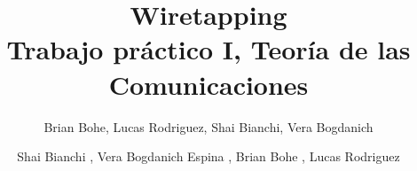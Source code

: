 \documentclass[journal]{IEEEtran}
\begin{document}
\title{Wiretapping \\ {\large Trabajo pr\'actico I, Teor\'ia de las Comunicaciones}}

\author{Brian Bohe, Lucas Rodriguez, Shai Bianchi, Vera Bogdanich}

\author{Shai Bianchi ,
        Vera Bogdanich Espina ,
        Brian Bohe ,
        Lucas Rodriguez }

\maketitle
\iffalse
\begin{abstract}
\blindtext[1]
\end{abstract}

  \begin{IEEEkeywords}
    Scapy, Sniff, Fuentes de información.
  \end{IEEEkeywords}
\fi

\IEEEpeerreviewmaketitle








\appendices


\iffalse
\begin{thebibliography}{1}
\bibitem{IEEEhowto:kopka}
H.~Kopka and P.~W. Daly, \emph{A Guide to \LaTeX}, 3rd~ed.\hskip 1em plus
  0.5em minus 0.4em\relax Harlow, England: Addison-Wesley, 1999.
\end{thebibliography}
\fi
\end{document}
